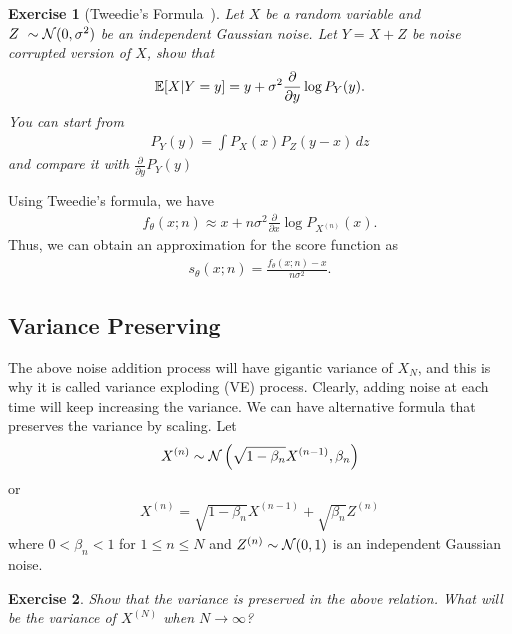 \documentclass[11pt, a4paper]{article}
\newtheorem{exercise}{Exercise}
\begin{document}
\begin{exercise}[Tweedie's Formula~\cite{efron2011tweedie}]
    Let $X$ be a random variable and $Z~\sim{\cal N}(0, \sigma^2)$ be an independent Gaussian noise.
    Let $Y= X+Z$ be noise corrupted version of $X$, show that
    \begin{align}
        \mathbb{E}[X|Y=y]  = y + \sigma^2 \frac{\partial}{\partial y} \log P_{Y}(y).
    \end{align}
    You can start from 
    \begin{align}
        P_Y(y) = \int P_X(x) P_Z(y-x)\, dz 
    \end{align}
    and compare it with $\frac{\partial}{\partial y} P_Y(y)$
\end{exercise}

Using Tweedie's formula, we have
\begin{align}
    f_{\theta}(x;n) \approx x + n\sigma^2 \frac{\partial}{\partial x} \log P_{X^{(n)}}(x).
\end{align}
Thus, we can obtain an approximation for the score function as
\begin{align}
    s_\theta(x;n) = \frac{f_{\theta}(x; n) - x}{n\sigma^2}.
\end{align}



\subsection{Variance Preserving}
The above noise addition process will have gigantic variance of $X_N$,
and this is why it is called variance exploding (VE) process.
Clearly, adding noise at each time will keep increasing the variance.
We can have alternative formula that preserves the variance by scaling.
Let
\begin{align}
    X^{(n)} \sim {\cal N}\left(\sqrt{1-\beta_n} X^{(n-1)},\beta_n \right)
\end{align}
or 
\begin{align}
    X^{(n)} = \sqrt{1-\beta_n} X^{(n-1)} + \sqrt{\beta_n }Z^{(n)}
\end{align}
where $0<\beta_n<1$ for $1\leq n\leq N$ and $Z^{(n)}\sim{\cal N}(0, 1)$ is an independent Gaussian noise.

\begin{exercise}
    Show that the variance is preserved in the above relation.
    What will be the variance of $X^{(N)}$ when $N\rightarrow \infty$?
\end{exercise}
\end{document}
